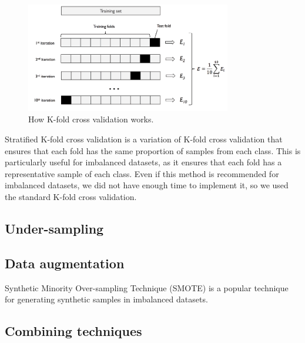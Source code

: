 \begin{figure}[htbp]
	\centering
	\includegraphics[width=0.8\textwidth]{../imgs/kfold.png}
	\caption{How K-fold cross validation works.\cite{Raschka-Mirjalili-2017}}
	\label{fig:k_fold}
\end{figure}


\label{subsubsec:stratified_k_fold_cross_validation}

Stratified K-fold cross validation is a variation of K-fold cross validation that ensures that each fold has the same proportion of samples 
from each class. This is particularly useful for imbalanced datasets, as it ensures that each fold has a representative sample of each class.
Even if this method is recommended for imbalanced datasets, we did not have enough time to implement it, so we used the standard K-fold cross validation.

\label{subsubsec:remaking_dataset}

\subsection{Under-sampling}
\label{subsec:under_sampling}

\subsection{Data augmentation}
\label{subsec:data_augmentation}

\label{subsubsec:smote}

Synthetic Minority Over-sampling Technique (SMOTE) is a popular technique for generating synthetic samples in imbalanced datasets.

\subsection{Combining techniques}
\label{subsec:combining_techniques}